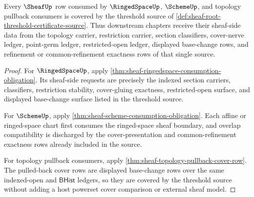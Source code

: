 \begin{theorem}
\label{thm:sheaf-root-threshold-downstream-coverage-obligation}
Every $\SheafUp$ row consumed by $\RingedSpaceUp$, $\SchemeUp$, and topology pullback consumers is covered by the threshold source of \autoref{def:sheaf-root-threshold-certificate-source}. Thus downstream chapters receive their sheaf-side data from the topology carrier, restriction carrier, section classifiers, cover-nerve ledger, point-germ ledger, restricted-open ledger, displayed base-change rows, and refinement or common-refinement exactness rows of that single source.
\end{theorem}
\begin{proof}
For $\RingedSpaceUp$, apply \autoref{thm:sheaf-ringedspace-consumption-obligation}. Its sheaf-side requests are precisely the indexed section carriers, classifiers, restriction stability, cover-gluing exactness, restricted-open surface, and displayed base-change surface listed in the threshold source.

For $\SchemeUp$, apply \autoref{thm:sheaf-scheme-consumption-obligation}. Each affine or ringed-space chart first consumes the ringed-space sheaf boundary, and overlap compatibility is discharged by the cover-presentation and common-refinement exactness rows already included in the source.

For topology pullback consumers, apply \autoref{thm:sheaf-topology-pullback-cover-row}. The pulled-back cover rows are displayed base-change rows over the same indexed-open and $\mathsf{BHist}$ ledgers, so they are covered by the threshold source without adding a host powerset cover comparison or external sheaf model.
\end{proof}

